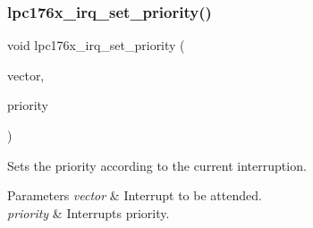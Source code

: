\subsubsection{\texorpdfstring{lpc176x\_irq\_set\_priority()}{lpc176x\_irq\_set\_priority()}}
{\footnotesize\ttfamily void lpc176x\+\_\+irq\+\_\+set\+\_\+priority (\begin{DoxyParamCaption}\item[{\mbox{\hyperlink{group__ClassicINTR_ga3e434c197d99f128e78cae4d9358bd8b}{rtems\+\_\+vector\+\_\+number}}}]{vector,  }\item[{unsigned}]{priority }\end{DoxyParamCaption})}



Sets the priority according to the current interruption. 


\begin{DoxyParams}{Parameters}
{\em vector} & Interrupt to be attended. \\
\hline
{\em priority} & Interrupts priority. \\
\hline
\end{DoxyParams}
